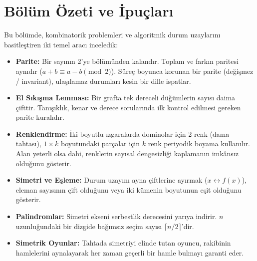 \section{Bölüm Özeti ve İpuçları}

Bu bölümde, kombinatorik problemleri ve algoritmik durum uzaylarını basitleştiren iki temel aracı inceledik:

\begin{itemize}
    \item \textbf{Parite:} Bir sayının 2'ye bölümünden kalandır. Toplam ve farkın paritesi aynıdır ($a+b \equiv a-b \pmod 2$). Süreç boyunca korunan bir parite (değişmez / invariant), ulaşılamaz durumları kesin bir dille ispatlar.
\item \textbf{El Sıkışma Lemması:} Bir grafta tek dereceli düğümlerin sayısı daima çifttir. Tanışıklık, kenar ve derece sorularında ilk kontrol edilmesi gereken parite kuralıdır.
    \item \textbf{Renklendirme:} İki boyutlu ızgaralarda dominolar için 2 renk (dama tahtası), $1 \times k$ boyutundaki parçalar için $k$ renk periyodik boyama kullanılır. Alan yeterli olsa dahi, renklerin sayısal dengesizliği kaplamanın imkânsız olduğunu gösterir.
    \item \textbf{Simetri ve Eşleme:} Durum uzayını ayna çiftlerine ayırmak ($x \leftrightarrow f(x)$), eleman sayısının çift olduğunu veya iki kümenin boyutunun eşit olduğunu gösterir.
    \item \textbf{Palindromlar:} Simetri ekseni serbestlik derecesini yarıya indirir. $n$ uzunluğundaki bir dizgide bağımsız seçim sayısı $\lceil n / 2 \rceil$'dir.
    \item \textbf{Simetrik Oyunlar:} Tahtada simetriyi elinde tutan oyuncu, rakibinin hamlelerini aynalayarak her zaman geçerli bir hamle bulmayı garanti eder.
\end{itemize}
